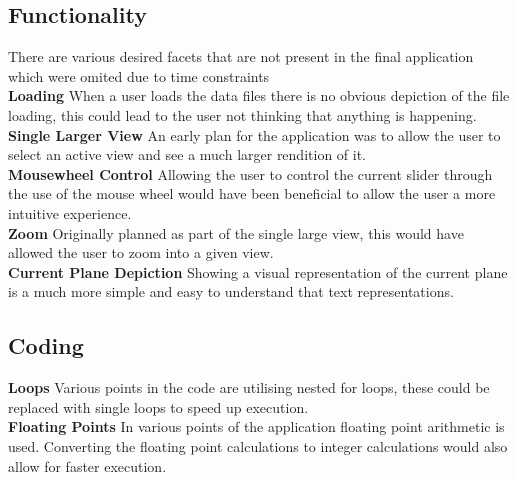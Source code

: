 \documentclass[pdftex,a4paper,10pt,titlepage]{article}
\begin{document}
\subsection{Functionality}
There are various desired facets that are not present in the final application which were omited due to time constraints\\
\textbf{Loading}
When a user loads the data files there is no obvious depiction of the file loading, this could lead to the user not thinking that anything is happening. \\
\textbf{Single Larger View}
An early plan for the application was to allow the user to select an active view and see a much larger rendition of it. \\
\textbf{Mousewheel Control}
Allowing the user to control the current slider through the use of the mouse wheel would have been beneficial to allow the user a more intuitive experience.\\
\textbf{Zoom}
Originally planned as part of the single large view, this would have allowed the user to zoom into a given view.\\
\textbf{Current Plane Depiction}
Showing a visual representation of the current plane is a much more simple and easy to understand that text representations.
\subsection{Coding}
\textbf{Loops}
Various points in the code are utilising nested for loops, these could be replaced with single loops to speed up execution.\\
\textbf{Floating Points}
In various points of the application floating point arithmetic is used. Converting the floating point calculations to integer calculations would also allow for faster execution.












\end{document}

